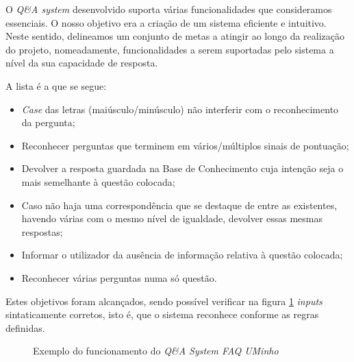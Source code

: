 \qquad O \textit{Q\&A system} desenvolvido suporta várias funcionalidades que consideramos essenciais. O nosso objetivo era a criação de um sistema eficiente e intuitivo. Neste sentido, delineamos um conjunto de metas a atingir ao longo da realização do projeto, nomeadamente, funcionalidades a serem suportadas pelo sistema a nível da sua capacidade de resposta.

A lista é a que se segue:
\begin{itemize}
    \item \textit{Case} das letras (maiúsculo/minúsculo) não interferir com o reconhecimento da pergunta;
    \item Reconhecer perguntas que terminem em vários/múltiplos sinais de pontuação;
    \item Devolver a resposta guardada na Base de Conhecimento cuja intenção seja o mais semelhante à questão colocada;
    \item Caso não haja uma correspondência que se destaque de entre as existentes, havendo várias com o mesmo nível de igualdade, devolver essas mesmas respostas;
    \item Informar o utilizador da ausência de informação relativa à questão colocada;
    \item Reconhecer várias perguntas numa só questão.
\end{itemize}

Estes objetivos foram alcançados, sendo possível verificar na figura \ref{fig:funcs} \textit{inputs} sintaticamente corretos, isto é, que o sistema reconhece conforme as regras definidas.  

\begin{figure}[H]
\begin{center}
    \caption{Exemplo do funcionamento do \textit{Q\&A System FAQ UMinho}}
    \label{fig:funcs}
\end{center}
\end{figure}




